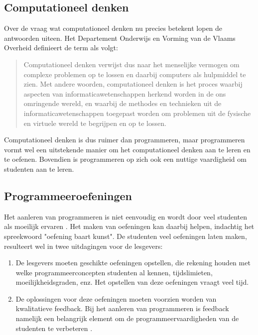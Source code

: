 \subsection{Computationeel denken}\label{subsec:computationeel-denken}

Over de vraag wat computationeel denken nu precies betekent lopen de antwoorden uiteen.
Het Departement Onderwijs en Vorming van de Vlaams Overheid \autocite{bastiaensen2017} definieert de term als volgt:

\begin{quote}
    Computationeel denken verwijst dus naar het menselijke vermogen om complexe problemen op te lossen en daarbij computers als hulpmiddel te zien.
    Met andere woorden, computationeel denken is het proces waarbij aspecten van informaticawetenschappen herkend worden in de ons omringende wereld, en waarbij de methodes en technieken uit de informaticawetenschappen toegepast worden om problemen uit de fysische en virtuele wereld te begrijpen en op te lossen.
\end{quote}

Computationeel denken is dus ruimer dan programmeren, maar programmeren vormt wel een uitstekende manier om het computationeel denken aan te leren en te oefenen.
Bovendien is programmeren op zich ook een nuttige vaardigheid om studenten aan te leren.

\subsection{Programmeeroefeningen}\label{subsec:programmeeroefeningen}

Het aanleren van programmeren is niet eenvoudig en wordt door veel studenten als moeilijk ervaren \autocite{10.1145/3293881.3295779}.
Het maken van oefeningen kan daarbij helpen, indachtig het spreekwoord "oefening baart kunst".
De studenten veel oefeningen laten maken, resulteert wel in twee uitdagingen voor de lesgevers:
\begin{enumerate}
    \item De lesgevers moeten geschikte oefeningen opstellen, die rekening houden met welke programmeerconcepten studenten al kennen, tijdslimieten, moeilijkheidsgraden, enz.
    Het opstellen van deze oefeningen vraagt veel tijd.
    \item De oplossingen voor deze oefeningen moeten voorzien worden van kwalitatieve feedback.
    Bij het aanleren van programmeren is feedback namelijk een belangrijk element om de programmeervaardigheden van de studenten te verbeteren \autocite{10.1145/2899415.2899422}.
\end{enumerate}

